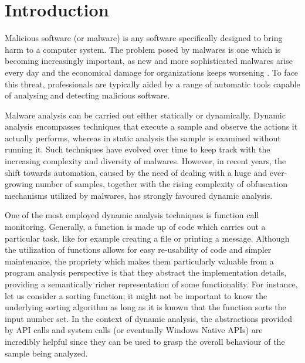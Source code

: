 
\chapter{Introduction}

\iffalse
Malwares are a threat

Dynamic analysis is favoured over static analysis

One dynamic analysis technique is API hooking/tracing

Malwares are also evasive

Problem: API hooking and tracing evasive samples

Solution BlueTracer
\fi

Malicious software (or malware) is any software specifically designed to bring harm to a computer system. The problem posed by malwares is one which is becoming increasingly important, as new and more sophisticated malwares arise every day and the economical damage for organizations keeps worsening \cite{Cisco}. To face this threat, professionals are typically aided by a range of automatic tools capable of analysing and detecting malicious software.

Malware analysis can be carried out either statically or dynamically. Dynamic analysis encompasses techniques that execute a sample and observe the actions it actually performs, whereas in static analysis the sample is examined without running it. Such techniques have evolved over time to keep track with the increasing complexity and diversity of malwares. However, in recent years, the shift towards automation, caused by the need of dealing with a huge and ever-growing number of samples, together with the rising complexity of obfuscation mechanisms utilized by malwares, has strongly favoured dynamic analysis.  

One of the most employed dynamic analysis techniques is function call monitoring. Generally, a function is made up of code which carries out a particular task, like for example creating a file or printing a message. Although the utilization of functions allows for easy re-usability of code and simpler maintenance, the propriety which makes them particularly valuable from a program analysis perspective is that they abstract the implementation details, providing a semantically richer representation of some functionality. For instance, let us consider a sorting function; it might not be important to know the underlying sorting algorithm as long as it is known that the function sorts the input number set. In the context of dynamic analysis, the abstractions provided by API calls and system calls (or eventually Windows Native APIs) are incredibly helpful since they can be used to grasp the overall behaviour of the sample being analyzed.

